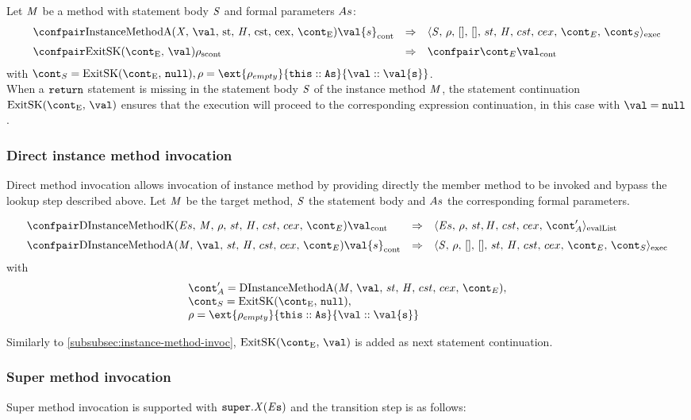 \documentclass{article}
\begin{document}
\noindent
Let $\mathit{M}$ be a method with statement body $\mathit{S}$ and formal parameters $As$:
\[
  \begin{array}{lcl}
	\cesktrans{
		\contconf{\InstanceMethodInvocationArgsApp}{\val{s}}}{
		\execconf{\stmt}{\env}{[]}{[]}{\handler}{\cstrace}{\cex}{\econt}{\scont}}
	\\[2mm]
	\cesktrans{
		\scontconf{\ExitSK{\val}}{\env}}{
		\contconf{\econt}{\val}}
  \end{array}
\]
with $\scont = \ExitSK{\tt{null}}, \env = \ext{\env_{empty}}{\this :: \formals}{\val :: \val{s}}$.\\[2mm]

\noindent
When a $\tt{return}$ statement is missing in the statement body $\mathit{S}$ of the instance method $\mathit{M}$, the statement continuation $\ExitSK{\val}$ ensures that the execution will proceed to the corresponding expression continuation, in this case with $\val = \tt{null}$.

\subsubsection{Direct instance method invocation}
\label{subsubsec:direct-instance-method-invoc}
Direct method invocation allows invocation of instance method by providing directly the member method to be invoked and bypass the lookup step described above. Let $\mathit{M}$ be the target method, $\mathit{S}$ the statement body and $As$ the corresponding formal parameters.

\[
  \begin{array}{lcl}
	\cesktrans{
		\contconf{\DInstanceMethodK}{\val}}{
		\evallistconf{\expressionsmeta}{\env}{\strace}{\cstrace}{\cex}{\acont'}}
	\\[2mm]

	\cesktrans{
		\contconf{\DInstanceMethodA}{\val{s}}}{
		\execconf{\stmt}{\env}{[]}{[]}{\handler}{\cstrace}{\cex}{\econt}{\scont}}
  \end{array}
\]
with
\[
\begin{array}{l}
	\acont' = \DInstanceMethodA,\\
	\scont = \ExitSK{\tt{null}},\\
	\env = \ext{\env_{empty}}{\this :: \formals}{\val :: \val{s}}
\end{array}
\]

\noindent
Similarly to \ref{subsubsec:instance-method-invoc}, $\ExitSK{\val}$ is added as next statement continuation.

\subsubsection{Super method invocation}
\label{subsubsec:super-method-invocation}
Super method invocation is supported with $\tt{super}.\mathit{X}(\mathit{E}{s})$ and the transition step is as follows:
	
\end{document}
